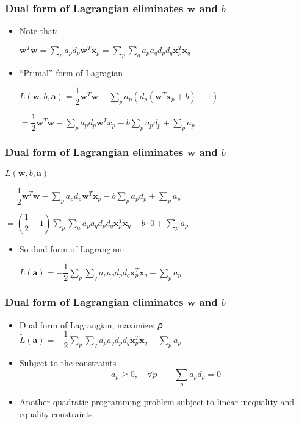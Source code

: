 \documentclass[12pt,notes,mathserif]{beamer}
\begin{document}
\begin{frame}[c]
\frametitle{Dual form of Lagrangian eliminates $\mathbf{w}$ and $b$}
\begin{itemize}
\item Note that:

$\mathbf{w}^T\mathbf{w}=\sum\limits_pa_pd_p\mathbf{w}^T\mathbf{x}_p=\sum\limits_p\sum\limits_qa_pa_qd_pd_q\mathbf{x}_p^T\mathbf{x}_q$
\item ``Primal'' form of Lagragian

$L(\mathbf{w},b,\mathbf{a})=\dfrac{1}{2}\mathbf{w}^T\mathbf{w}-\sum\limits_pa_p(d_p(\mathbf{w}^T\mathbf{x}_p+b)-1)$

$=\dfrac{1}{2}\mathbf{w}^T\mathbf{w}-\sum\limits_pa_pd_p\mathbf{w}^Tx_p-b\sum\limits_pa_pd_p+\sum\limits_pa_p$
\end{itemize}

\end{frame}

\begin{frame}[c]
\frametitle{Dual form of Lagrangian eliminates $\mathbf{w}$ and $b$}
$L(\mathbf{w},b,\mathbf{a})$

$=\dfrac{1}{2}\mathbf{w}^T\mathbf{w}-\sum\limits_pa_pd_p\mathbf{w}^T\mathbf{x}_p-b\sum\limits_pa_pd_p+\sum\limits_pa_p$

$=\left(\dfrac{1}{2}-1\right)\sum\limits_p\sum\limits_aa_pa_qd_pd_q\mathbf{x}_p^T\mathbf{x}_q-b\cdot 0+\sum\limits_pa_p$
\begin{itemize}
\item So dual form of Lagrangian:

$\tilde{L}(\mathbf{a})=-\dfrac{1}{2}\sum\limits_p\sum\limits_qa_pa_qd_pd_q\mathbf{x}_p^T\mathbf{x}_q+\sum\limits_pa_p$
\end{itemize}

\end{frame}

\begin{frame}[c]
\frametitle{Dual form of Lagrangian eliminates $\mathbf{w}$ and $b$}
\begin{itemize}
\item Dual form of Lagrangian, maximize:
𝑝
$\tilde{L}(\mathbf{a})=-\dfrac{1}{2}\sum\limits_p\sum\limits_qa_pa_qd_pd_q\mathbf{x}_p^T\mathbf{x}_q+\sum\limits_pa_p$
\item Subject to the constraints
\[
a_p\geqslant{}0, \quad \forall p\qquad \sum_p a_pd_p=0
\]
\item Another quadratic programming problem subject to linear inequality and equality constraints
\end{itemize}
\end{frame}
\end{document}
